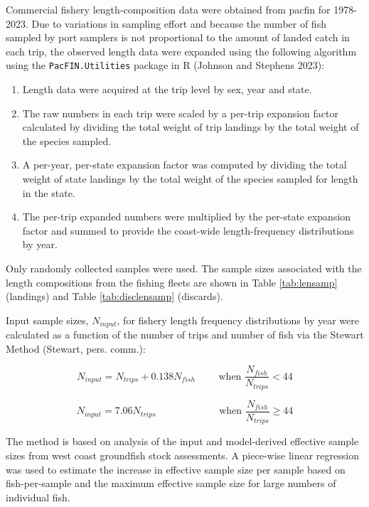 \documentclass[11pt,
  english,
  letterpaper,
]{article}
\providecommand{\tightlist}{%
  \setlength{\itemsep}{0pt}\setlength{\parskip}{0pt}}
\providecommand{\tightlist}{%
  \setlength{\itemsep}{0pt}\setlength{\parskip}{0pt}}
\begin{document}
Commercial fishery length-composition data were obtained from \gls{pacfin} for 1978-2023. Due to variations in sampling effort and because the number of fish sampled by port samplers is not proportional to the amount of landed catch in each trip, the observed length data were expanded using the following algorithm using the \texttt{PacFIN.Utilities} package in R (Johnson and Stephens 2023):

\begin{enumerate}
\def\labelenumi{\arabic{enumi}.}
\tightlist
\item
  Length data were acquired at the trip level by sex, year and state.
\item
  The raw numbers in each trip were scaled by a per-trip expansion factor calculated by dividing the total weight of trip landings by the total weight of the species sampled.
\item
  A per-year, per-state expansion factor was computed by dividing the total weight of state landings by the total weight of the species sampled for length in the state.
\item
  The per-trip expanded numbers were multiplied by the per-state expansion factor and summed to provide the coast-wide length-frequency distributions by year.
\end{enumerate}

Only randomly collected samples were used. The sample sizes associated with the length compositions from the fishing fleets are shown in Table \ref{tab:lensamp} (landings) and Table \ref{tab:disclensamp} (discards).

Input sample sizes, \({N_{input}}\), for fishery length frequency distributions by year were calculated as a function of the number of trips and number of fish via the Stewart Method (Stewart, pers. comm.):

\begin{equation} {N_{input} = N_{trips} + 0.138N_{fish}}\qquad\text{ when }\frac{N_{fish}}{N_{trips}}<44 \end{equation}

\begin{equation} {N_{input} = 7.06N_{trips}}\qquad\qquad\qquad\text{ when }\frac{N_{fish}}{N_{trips}}\ge 44 \end{equation}

The method is based on analysis of the input and model-derived effective sample sizes from west coast groundfish stock assessments. A piece-wise linear regression was used to estimate the increase in effective sample size per sample based on fish-per-sample and the maximum effective sample size for large numbers of individual fish.
\end{document}
